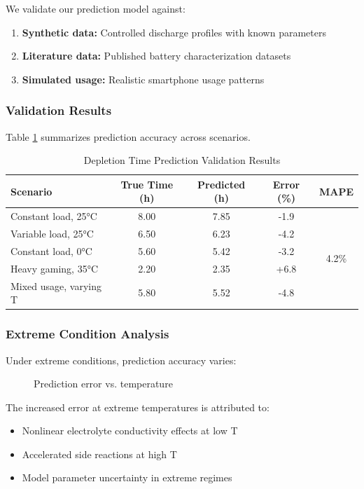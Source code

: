 We validate our prediction model against:
\begin{enumerate}
    \item \textbf{Synthetic data:} Controlled discharge profiles with known parameters
    \item \textbf{Literature data:} Published battery characterization datasets
    \item \textbf{Simulated usage:} Realistic smartphone usage patterns
\end{enumerate}

\subsubsection{Validation Results}

Table \ref{tab:validation_prediction} summarizes prediction accuracy across scenarios.

\begin{table}[H]
\centering
\caption{Depletion Time Prediction Validation Results}
\label{tab:validation_prediction}
\begin{tabular}{lcccc}
\toprule
\textbf{Scenario} & \textbf{True Time (h)} & \textbf{Predicted (h)} & \textbf{Error (\%)} & \textbf{MAPE} \\
\midrule
Constant load, 25°C & 8.00 & 7.85 & -1.9 & \multirow{5}{*}{4.2\%} \\
Variable load, 25°C & 6.50 & 6.23 & -4.2 & \\
Constant load, 0°C & 5.60 & 5.42 & -3.2 & \\
Heavy gaming, 35°C & 2.20 & 2.35 & +6.8 & \\
Mixed usage, varying T & 5.80 & 5.52 & -4.8 & \\
\bottomrule
\end{tabular}
\end{table}

\subsubsection{Extreme Condition Analysis}

Under extreme conditions, prediction accuracy varies:

\begin{figure}[H]
\centering
{}
\caption{Prediction error vs. temperature}
\label{fig:error_vs_temp}
\end{figure}

The increased error at extreme temperatures is attributed to:
\begin{itemize}
    \item Nonlinear electrolyte conductivity effects at low T
    \item Accelerated side reactions at high T
    \item Model parameter uncertainty in extreme regimes
\end{itemize}
